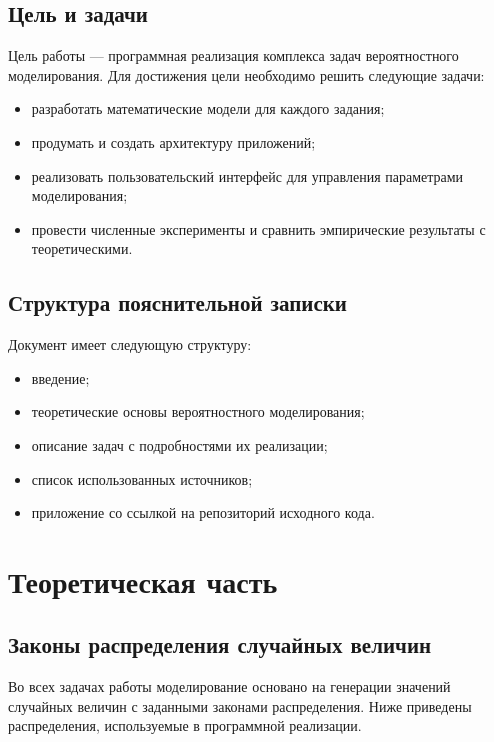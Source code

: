\documentclass[14pt]{extarticle}
\begin{document}
\subsection{Цель и задачи}
\label{sec:orgd474bf5}

Цель работы --- программная реализация комплекса задач вероятностного моделирования. Для достижения цели необходимо решить следующие задачи:

\begin{itemize}
\item разработать математические модели для каждого задания;
\item продумать и создать архитектуру приложений;
\item реализовать пользовательский интерфейс для управления параметрами моделирования;
\item провести численные эксперименты и сравнить эмпирические результаты с теоретическими.
\end{itemize}
\subsection{Структура пояснительной записки}
\label{sec:org0f3a2c7}

Документ имеет следующую структуру:

\begin{itemize}
\item введение;
\item теоретические основы вероятностного моделирования;
\item описание задач с подробностями их реализации;
\item список использованных источников;
\item приложение со ссылкой на репозиторий исходного кода.
\end{itemize}

\clearpage
\section{Теоретическая часть}
\label{sec:org2ff3332}

\subsection{Законы распределения случайных величин}
\label{sec:org6b63750}

Во всех задачах работы моделирование основано на генерации значений случайных величин с заданными законами распределения. Ниже приведены распределения, используемые в программной реализации.
\end{document}
